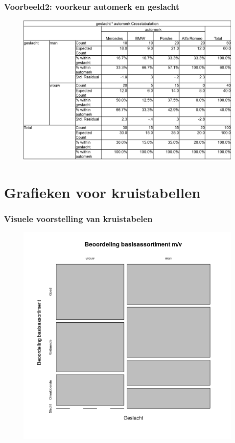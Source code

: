 \documentclass[aspectratio=169]{beamer}
\begin{document}
\begin{frame}
  \frametitle{Voorbeeld2: voorkeur automerk en geslacht}

  \begin{figure}
    \centering
    \includegraphics[width=1.00\textwidth]{img/les3-spssCars.png}
    \label{fig:les3-spssCars}
  \end{figure}

\end{frame}

\section{Grafieken voor kruistabellen}

\begin{frame}
  \frametitle{Visuele voorstelling van kruistabelen}
  
  \begin{figure}
    \centering
    \includegraphics[height=.9\textheight]{img/2var-xtab-plot-waardering}
  \end{figure}
  
\end{frame}
\end{document}
